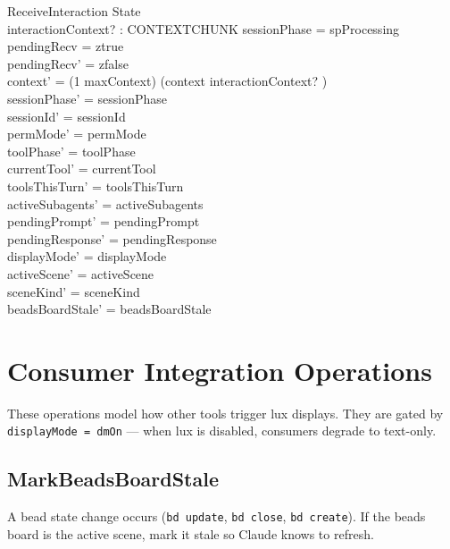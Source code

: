 \documentclass[a4paper,10pt,fleqn]{article}
\begin{document}
\begin{schema}{ReceiveInteraction}
  \Delta State \\
  interactionContext? : CONTEXTCHUNK
  \where
  sessionPhase = spProcessing \\
  pendingRecv = ztrue \\
  pendingRecv' = zfalse \\
  context' = (1 \upto maxContext) \dres (context \cat \langle interactionContext? \rangle) \\
  sessionPhase' = sessionPhase \\
  sessionId' = sessionId \\
  permMode' = permMode \\
  toolPhase' = toolPhase \\
  currentTool' = currentTool \\
  toolsThisTurn' = toolsThisTurn \\
  activeSubagents' = activeSubagents \\
  pendingPrompt' = pendingPrompt \\
  pendingResponse' = pendingResponse \\
  displayMode' = displayMode \\
  activeScene' = activeScene \\
  sceneKind' = sceneKind \\
  beadsBoardStale' = beadsBoardStale
\end{schema}

\section{Consumer Integration Operations}

These operations model how other tools trigger lux displays.
They are gated by \texttt{displayMode = dmOn} --- when lux is
disabled, consumers degrade to text-only.

\subsection{MarkBeadsBoardStale}

A bead state change occurs (\texttt{bd update}, \texttt{bd close},
\texttt{bd create}). If the beads board is the active scene,
mark it stale so Claude knows to refresh.
\end{document}
